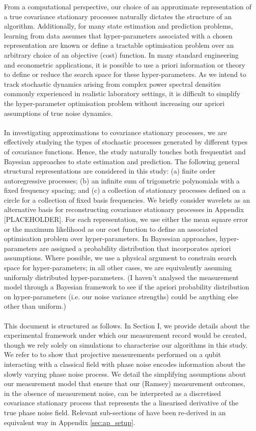 From a computational perspective, our choice of an approximate representation of a true covariance stationary processes naturally dictates the structure of an algorithm. Additionally, for many state estimation and prediction problems, learning from data assumes that hyper-parameters associated with a chosen representation are known or define a tractable optimisation problem over an arbitrary choice of an objective (cost) function. In many standard engineering and econometric applications, it is possible to use a priori information or theory to define or reduce the search space for these hyper-parameters. As we intend to track stochastic dynamics arising from complex power spectral densities commonly experienced in realistic laboratory settings, it is difficult to simplify the hyper-parameter optimisation problem without increasing our apriori assumptions of true noise dynamics. 
\\
\\
In investigating approximations to covariance stationary processes, we are effectively studying the types of stochastic processes generated by different types of covariance functions. Hence, the study naturally touches both frequentist and Bayesian approaches to state estimation and prediction. The following general structural representations are considered in this study: (a) finite order autoregressive processes; (b) an infinite sum of trigometric polynomials with a fixed frequency spacing; and (c) a collection of stationary processes defined on a circle for a collection of fixed basis frequencies. We briefly consider wavelets as an alternative basis for reconstructing covariance stationary processes in Appendix [PLACEHOLDER]. For each representation, we use either the mean square error or the maximum likelihood as our cost function to define an associated optimisation problem over hyper-parameters. In Baysesian approaches, hyper-parameters are assigned a probability distribution that incorporates apriori assumptions. Where possible, we use a physical argument to constrain search space for hyper-parameters; in all other cases, we are equivalently assuming uniformly distributed hyper-parameters. (I haven't analysed the measurement model through a Bayesian framework to see if the apriori probability distribution on hyper-parameters (i.e. our noise variance strengths) could be anything else other than uniform.)  
\\
\\
This document is structured as follows. In Section I, we provide details about the experimental framework under which our measurement record would be created, though we rely solely on simulations to characterise our algorithms in this study. We refer to \cite{soare} to show that projective measurements performed on a qubit interacting with a classical field with phase noise encodes information about the slowly varying phase noise process. We detail the simplifying assumptions about our measurement model that ensure that our (Ramsey) measurement outcomes, in the absence of measurement noise, can be interpreted as a discretised covariance stationary process that represents the a linearised derivative of the true phase noise field. Relevant sub-sections of \cite{soare} have been re-derived in an equivalent way in Appendix \ref{sec:ap_setup}.
